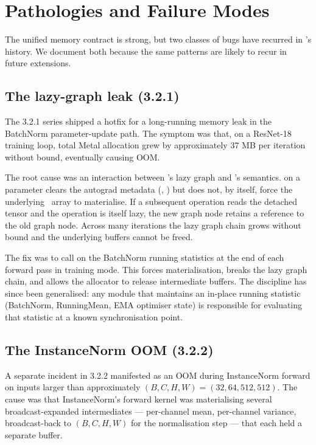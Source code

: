 \section{Pathologies and Failure Modes}
\label{sec:unified_memory:pathologies}

The unified memory contract is strong, but two classes of bugs have
recurred in \Lucid's history. We document both because the same
patterns are likely to recur in future extensions.

\subsection{The lazy-graph leak (3.2.1)}
\label{ssec:unified_memory:lazy_leak}

The 3.2.1 series shipped a hotfix for a long-running memory leak in
the BatchNorm parameter-update path. The symptom was that, on a
ResNet-18 training loop, total Metal allocation grew by approximately
37 MB per iteration without bound, eventually causing OOM.

The root cause was an interaction between \MLX's lazy graph and
\Lucid's  semantics.  on a parameter
clears the autograd metadata (, )
but does not, by itself, force the underlying \MLX\ array to
materialise. If a subsequent operation reads the detached tensor and
the operation is itself lazy, the new graph node retains a reference
to the old graph node. Across many iterations the lazy graph chain
grows without bound and the underlying buffers cannot be freed.

The fix was to call  on the BatchNorm running
statistics at the end of each forward pass in training mode. This
forces materialisation, breaks the lazy graph chain, and allows the
allocator to release intermediate buffers. The discipline has since
been generalised: any module that maintains an in-place running
statistic (BatchNorm, RunningMean, EMA optimiser state) is
responsible for evaluating that statistic at a known synchronisation
point.

\subsection{The InstanceNorm OOM (3.2.2)}
\label{ssec:unified_memory:instancenorm_oom}

A separate incident in 3.2.2 manifested as an OOM during
InstanceNorm forward on inputs larger than approximately
\((B, C, H, W) = (32, 64, 512, 512)\). The cause was that
InstanceNorm's forward kernel was materialising several
broadcast-expanded intermediates --- per-channel mean, per-channel
variance, broadcast-back to \((B, C, H, W)\) for the normalisation
step --- that each held a separate buffer.

